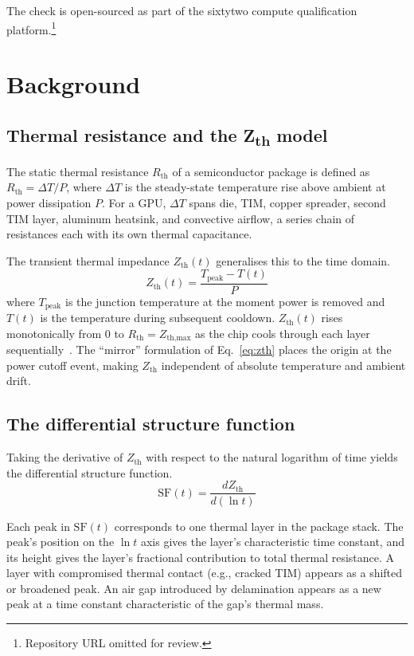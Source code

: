 \documentclass[conference]{IEEEtran}
\begin{document}
The check is open-sourced as part of the sixtytwo compute
qualification platform.\footnote{Repository URL omitted for review.}

\section{Background}
\label{sec:background}

\subsection{Thermal resistance and the Z\textsubscript{th} model}

The static thermal resistance $R_\text{th}$ of a semiconductor
package is defined as $R_\text{th} = \Delta T / P$, where $\Delta T$
is the steady-state temperature rise above ambient at power
dissipation $P$.
For a GPU, $\Delta T$ spans die, TIM, copper spreader, second TIM
layer, aluminum heatsink, and convective airflow, a series chain of
resistances each with its own thermal capacitance.

The transient thermal impedance $Z_\text{th}(t)$ generalises this to
the time domain.
\begin{equation}
  Z_\text{th}(t) = \frac{T_\text{peak} - T(t)}{P}
  \label{eq:zth}
\end{equation}
where $T_\text{peak}$ is the junction temperature at the moment
power is removed and $T(t)$ is the temperature during subsequent
cooldown.
$Z_\text{th}(t)$ rises monotonically from 0 to
$R_\text{th} = Z_\text{th,max}$ as the chip cools through each
layer sequentially~\cite{poppe2009}.
The ``mirror'' formulation of Eq.~\ref{eq:zth} places the origin at
the power cutoff event, making $Z_\text{th}$ independent of absolute
temperature and ambient drift.

\subsection{The differential structure function}

Taking the derivative of $Z_\text{th}$ with respect to the natural
logarithm of time yields the differential structure function.
\begin{equation}
  \text{SF}(t) = \frac{dZ_\text{th}}{d(\ln t)}
  \label{eq:sf}
\end{equation}

Each peak in $\text{SF}(t)$ corresponds to one thermal layer in the
package stack.
The peak's position on the $\ln t$ axis gives the layer's
characteristic time constant, and its height gives the layer's
fractional contribution to total thermal resistance.
A layer with compromised thermal contact (e.g., cracked TIM) appears
as a shifted or broadened peak. An air gap introduced by delamination
appears as a new peak at a time constant characteristic of the gap's
thermal mass.
\end{document}
